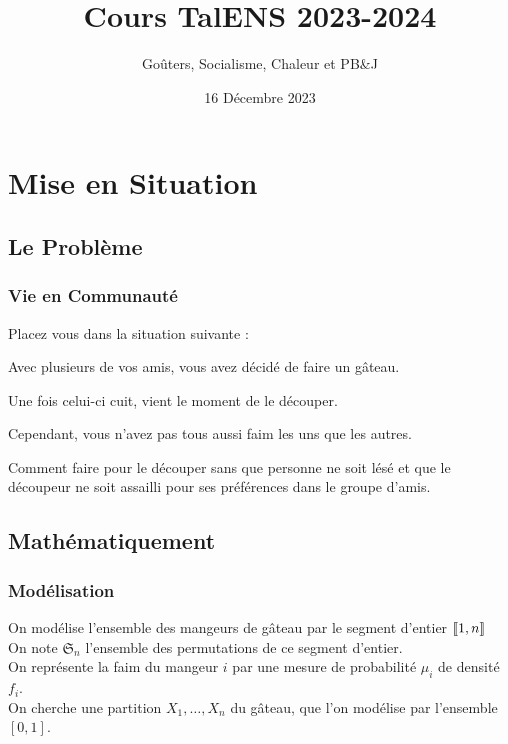 \documentclass{beamercours}
\title{Cours TalENS 2023-2024}
\subtitle{Goûters, Socialisme, Chaleur et PB\&J}
\date{16 Décembre 2023}
\begin{document}
\maketitle

\section{Mise en Situation}
\subsection{Le Problème}
\begin{frame}
    \frametitle{Vie en Communauté}
    Placez vous dans la situation suivante : \\
    \begin{itemize}
         {\item Avec plusieurs de vos amis, vous avez décidé de faire un gâteau.}
         {\item Une fois celui-ci cuit, vient le moment de le découper.}
         {\item Cependant, vous n'avez pas tous aussi faim les uns que les autres.}
         {\item Comment faire pour le découper sans que personne ne soit lésé et que le découpeur ne soit assailli pour ses préférences dans le groupe d'amis.}
    \end{itemize}
\end{frame}

\subsection{Mathématiquement}
\begin{frame}
    \frametitle{Modélisation}
     {On modélise l'ensemble des mangeurs de gâteau par le segment d'entier $\left\llbracket 1, n\right\rrbracket$\\}
     {On note $\mathfrak{S}_{n}$ l'ensemble des permutations de ce segment d'entier. \\}
     {On représente la faim du mangeur $i$ par une mesure de probabilité $\mu_{i}$ de densité $f_{i}$. \\}
     {On cherche une partition $X_{1}, \ldots, X_{n}$ du gâteau, que l'on modélise par l'ensemble $\left[0, 1\right]$.}
\end{frame}
\end{document}
